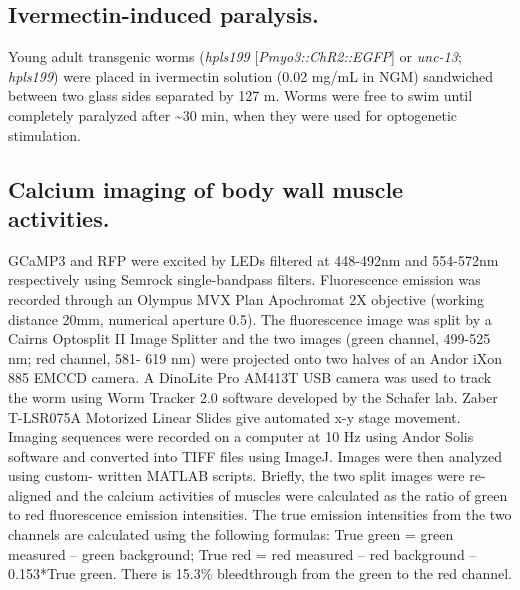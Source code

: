 \subsection{Ivermectin-induced paralysis.}
Young adult transgenic worms (\textit{hpls199} [\textit{Pmyo3::ChR2::EGFP}] 
or \textit{unc-13}; \textit{hpls199}) were placed in ivermectin solution (0.02 mg/mL in NGM) sandwiched 
between two glass sides separated by 127 \textmu m. Worms were free to swim until completely 
paralyzed after \textasciitilde 30 min, when they were used for optogenetic stimulation.

\subsection{Calcium imaging of body wall muscle activities.}

GCaMP3 and RFP were excited by LEDs 
filtered at 448-492nm and 554-572nm respectively using Semrock single-bandpass filters. 
Fluorescence emission was recorded through an Olympus MVX Plan Apochromat 2X objective 
(working distance 20mm, numerical aperture 0.5). The fluorescence image was split by a Cairns 
Optosplit II Image Splitter and the two images (green channel, 499-525 nm; red channel, 581- 
619 nm) were projected onto two halves of an Andor iXon 885 EMCCD camera. A DinoLite Pro 
AM413T USB camera was used to track the worm using Worm Tracker 2.0 software developed 
by the Schafer lab. Zaber T-LSR075A Motorized Linear Slides give automated x-y stage 
movement. Imaging sequences were recorded on a computer at 10 Hz using Andor Solis 
software and converted into TIFF files using ImageJ. Images were then analyzed using custom- 
written MATLAB scripts. Briefly, the two split images were re-aligned and the calcium activities 
of muscles were calculated as the ratio of green to red fluorescence emission intensities. The true 
emission intensities from the two channels are calculated using the following formulas: True 
green = green measured – green background; True red = red measured – red background – 
0.153*True green. There is 15.3\% bleedthrough from the green to the red channel. 

